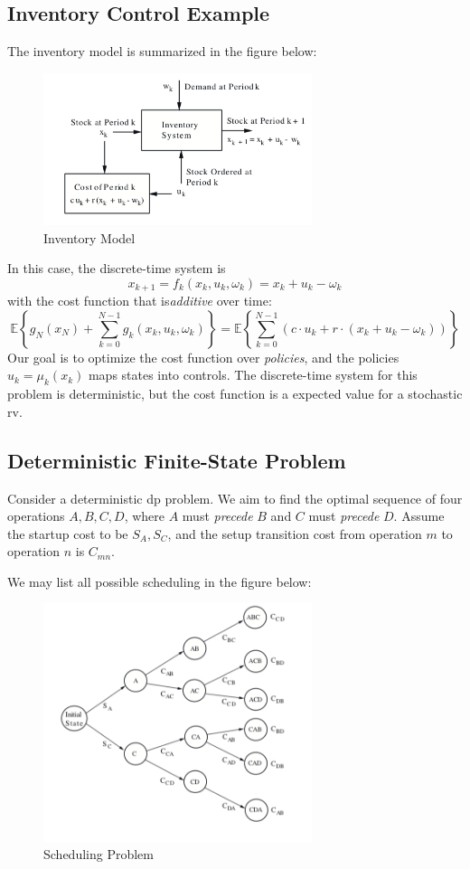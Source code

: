 \subsection{Inventory Control Example}\label{subsec:1:1:2}
The inventory model is summarized in the figure below:
\begin{figure}
\centering
\includegraphics[width = 0.7\textwidth]{First_lecture/p_2}
\caption{Inventory Model}
\end{figure}
In this case, the discrete-time system is
\[
x_{k+1} = f_k(x_k,u_k,\omega_k) = x_k + u_k - \omega_k
\]
with the cost function that is\emph{additive} over time:
\[
\mathbb{E}\left\{
g_N(x_N)+\sum_{k=0}^{N-1}g_k(x_k,u_k,\omega_k)
\right\}
=
\mathbb{E}\left\{
\sum_{k=0}^{N-1}(c\cdot u_k + r\cdot (x_k + u_k - \omega_k))
\right\}
\]
Our goal is to optimize the cost function over \emph{policies}, and the policies $u_k = \mu_k(x_k)$ maps states into controls. The discrete-time system for this problem is deterministic, but the cost function is a expected value for a stochastic rv.


\subsection{Deterministic Finite-State Problem}\label{subsec:1:1:3}
Consider a deterministic dp problem. We aim to find the optimal sequence of four operations $A,B,C,D$, where $A$ must \emph{precede} $B$ and $C$ must \emph{precede} $D$. Assume the startup cost to be $S_A,S_C$, and the setup transition cost from operation $m$ to operation $n$ is $C_{mn}$.

We may list all possible scheduling in the figure below:
\begin{figure}
\centering
\includegraphics[width = 0.7\textwidth]{First_lecture/p_3}
\caption{Scheduling Problem}
\end{figure}

